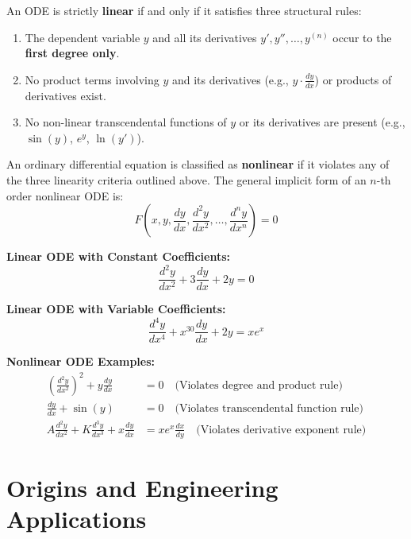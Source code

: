 \documentclass[11pt, a4paper, openany, oneside]{book}
\begin{document}
\begin{summarybox}
An ODE is strictly \textbf{linear} if and only if it satisfies three structural rules:
\begin{enumerate}[leftmargin=0.6cm]
\item The dependent variable $y$ and all its derivatives $y', y'', \dots, y^{(n)}$ occur to the \textbf{first degree only}.
\item No product terms involving $y$ and its derivatives (e.g., $y \cdot \frac{dy}{dx}$) or products of derivatives exist.
\item No non-linear transcendental functions of $y$ or its derivatives are present (e.g., $\sin(y)$, $e^y$, $\ln(y')$).
\end{enumerate}
\end{summarybox}

\begin{definitionbox}
An ordinary differential equation is classified as \textbf{nonlinear} if it violates any of the three linearity criteria outlined above. The general implicit form of an $n$-th order nonlinear ODE is:
\begin{equation}
    F\left(x, y, \frac{dy}{dx}, \frac{d^2 y}{dx^2}, \dots, \frac{d^n y}{dx^n}\right) = 0
\end{equation}
\end{definitionbox}

\begin{examplebox}
    \textbf{Linear ODE with Constant Coefficients:}
    \[ \frac{d^2 y}{dx^2} + 3\frac{dy}{dx} + 2y = 0 \]

    \textbf{Linear ODE with Variable Coefficients:}
    \[ \frac{d^4 y}{dx^4} + x^{30} \frac{dy}{dx} + 2y = x e^x \]

    \textbf{Nonlinear ODE Examples:}
    \begin{align*}
        \left(\frac{d^2 y}{dx^2}\right)^2 + y \frac{dy}{dx} &= 0 \quad \text{(Violates degree and product rule)} \\
        \frac{dy}{dx} + \sin(y) &= 0 \quad \text{(Violates transcendental function rule)} \\
        A \frac{d^2 y}{dx^2} + K \frac{d^3 y}{dx^3} + x \frac{dy}{dx} &= x e^x \frac{dx}{dy} \quad \text{(Violates derivative exponent rule)}
    \end{align*}
\end{examplebox}

\section{Origins and Engineering Applications}
\end{document}
